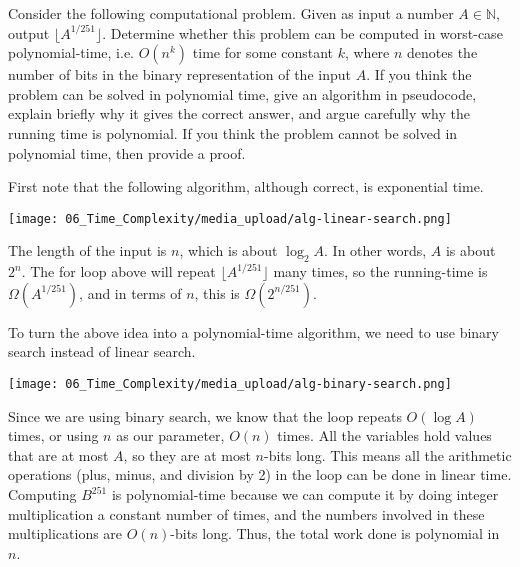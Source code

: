 \begin{flex}
\label{grp:exercise:251st-root}

\begin{exercise}[$251$st root]
\label{exercise:251st-root}
Consider the following computational problem. Given as input a number $A \in \mathbb{N}$, output $\lfloor A^{1/251}\rfloor$. Determine whether this problem can be computed in worst-case polynomial-time, i.e. $O(n^k)$ time for some constant $k$, where $n$ denotes the number of bits in the binary representation of the input $A$. If you think the problem can be solved in polynomial time, give an algorithm in pseudocode, explain briefly why it gives the correct answer, and argue carefully why the running time is polynomial. If you think the problem cannot be solved in polynomial time, then provide a proof.

\end{exercise}

\begin{solution}
\label{sol:time-complexity::although}
First note that the following algorithm, although correct, is exponential time.

\begin{center}
\texttt{[image: 06\_Time\_Complexity/media\_upload/alg-linear-search.png]}
\end{center}

The length of the input is $n$, which is about $\log_2 A$. In other words, $A$ is about $2^n$. The for loop above will repeat $\lfloor A^{1/251} \rfloor$ many times, so the running-time is $\Omega(A^{1/251})$, and in terms of $n$, this is $\Omega(2^{n/251})$.

To turn the above idea into a polynomial-time algorithm, we need to use binary search instead of linear search.

\begin{center}
\texttt{[image: 06\_Time\_Complexity/media\_upload/alg-binary-search.png]}
\end{center}

Since we are using binary search, we know that the loop repeats $O(\log A)$ times, or using $n$ as our parameter, $O(n)$ times. All the variables hold values that are at most $A$, so they are at most $n$-bits long. This means all the arithmetic operations (plus, minus, and division by 2) in the loop can be done in linear time. Computing $B^{251}$ is polynomial-time because we can compute it by doing integer multiplication a constant number of times, and the numbers involved in these multiplications are $O(n)$-bits long. Thus, the total work done is polynomial in $n$.

\end{solution}
\end{flex}



